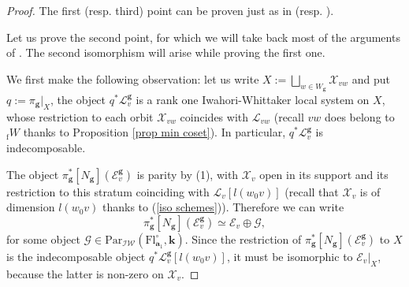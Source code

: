 \documentclass[11pt]{amsart}
\theoremstyle{plain}
\theoremstyle{remark}
\numberwithin{equation}{section}
\begin{document}
	\begin{proof}
		The first (resp. third) point can be proven just as in \cite[Proposition A.2]{epiga:4984} (resp. \cite[Lemma A.1]{epiga:4984}). 
		
		Let us prove the second point, for which we will take back most of the arguments of  \cite[Lemma A.5]{epiga:4984}. The second isomorphism will arise while proving the first one. 
		
		We first make the following observation: let us write $X:=\bigsqcup_{w\in W_\mathbf{g}}\mathscr{X}_{vw}$ and put $q:=\pi_\mathbf{g}|_X$, the object $q^*\mathcal{L}^\mathbf{g}_v$ is a rank one Iwahori-Whittaker local system on $X$, whose restriction to each orbit $\mathscr{X}_{vw}$ coincides with $\mathcal{L}_{vw}$ (recall $vw$ does belong to ${_\mathrm{f}W}$ thanks to Proposition \ref{prop min coset}). In particular, $q^*\mathcal{L}^\mathbf{g}_v$ is indecomposable.
		
		The object $\pi_{\mathbf{g}}^*[N_{\mathbf{g}}](\mathcal{E}_v^\mathbf{g})$ is parity by (1), with $\mathscr{X}_{v}$ open in its support and its restriction to this stratum coinciding with $\mathcal{L}_v[l(w_0v)]$ (recall that $\mathscr{X}_{v}$ is of dimension $l(w_0v)$ thanks to (\ref{iso schemes})). Therefore we can write
		\begin{equation}\label{eqpi0}
		    \pi_{\mathbf{g}}^*[N_{\mathbf{g}}](\mathcal{E}_v^\mathbf{g})\simeq \mathcal{E}_v\oplus\mathcal{G}, 
		\end{equation}
		for some object $\mathcal{G}\in \mathrm{Par}_{\mathcal{IW}}(\mathrm{Fl}^{\circ}_{\mathbf{a}_1},\mathbf{k})$. Since the restriction of $\pi_{\mathbf{g}}^*[N_{\mathbf{g}}](\mathcal{E}_v^\mathbf{g})$ to $X$ is the indecomposable object $q^*\mathcal{L}^\mathbf{g}_v[l(w_0v)]$, it must be isomorphic to  $\mathcal{E}_v|_X$, because the latter is non-zero on $\mathscr{X}_{v}$.
		

\end{proof}
\end{document}
